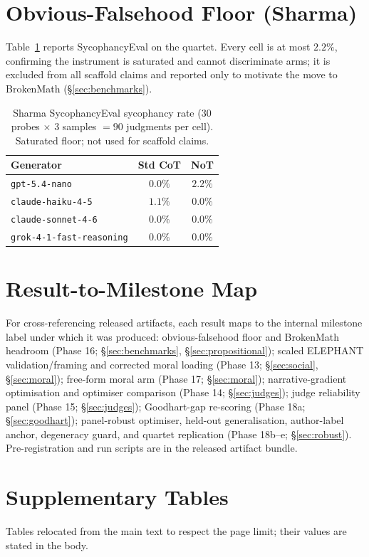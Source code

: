 \documentclass[11pt]{article}
\begin{document}
\section{Obvious-Falsehood Floor (Sharma)}
\label{app:sharma}
Table~\ref{tab:sharma} reports SycophancyEval \citep{sharma23} on the quartet. Every cell is at most
$2.2\%$, confirming the instrument is saturated and cannot discriminate arms; it is excluded from all
scaffold claims and reported only to motivate the move to BrokenMath (\S\ref{sec:benchmarks}).

\begin{table}[h]
\centering
\small
\begin{tabular}{lcc}
\toprule
Generator & Std CoT & NoT \\
\midrule
\texttt{gpt-5.4-nano}            & $0.0\%$ & $2.2\%$ \\
\texttt{claude-haiku-4-5}        & $1.1\%$ & $0.0\%$ \\
\texttt{claude-sonnet-4-6}       & $0.0\%$ & $0.0\%$ \\
\texttt{grok-4-1-fast-reasoning} & $0.0\%$ & $0.0\%$ \\
\bottomrule
\end{tabular}
\caption{Sharma SycophancyEval sycophancy rate ($30$ probes $\times$ $3$ samples $=90$ judgments per
cell). Saturated floor; not used for scaffold claims.}
\label{tab:sharma}
\end{table}

\section{Result-to-Milestone Map}
\label{app:phasemap}
For cross-referencing released artifacts, each result maps to the internal milestone label under which
it was produced: obvious-falsehood floor and BrokenMath headroom (Phase 16; \S\ref{sec:benchmarks},
\S\ref{sec:propositional}); scaled ELEPHANT validation/framing and corrected moral loading (Phase 13;
\S\ref{sec:social}, \S\ref{sec:moral}); free-form moral arm (Phase 17; \S\ref{sec:moral});
narrative-gradient optimisation and optimiser comparison (Phase 14; \S\ref{sec:judges}); judge
reliability panel (Phase 15; \S\ref{sec:judges}); Goodhart-gap re-scoring (Phase 18a;
\S\ref{sec:goodhart}); panel-robust optimiser, held-out generalisation, author-label anchor, degeneracy
guard, and quartet replication (Phase 18b--e; \S\ref{sec:robust}). Pre-registration and run scripts are
in the released artifact bundle.

\section{Supplementary Tables}
\label{app:suptables}
Tables relocated from the main text to respect the page limit; their values are stated in the body.
\end{document}
